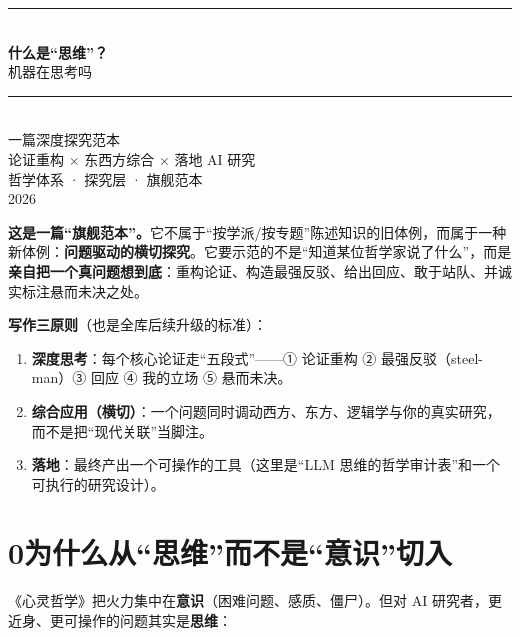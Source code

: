 \documentclass[12pt,a4paper,fontset=none]{ctexart}
\begin{document}
\thispagestyle{empty}
\begin{center}
\vspace*{3.2cm}
{\color{rule}\rule{0.5\textwidth}{0.8pt}}\\[1.1cm]
{\Huge\hei\bfseries\color{ink} 什么是“思维”？}\\[0.6cm]
{\LARGE\notolight\color{accent} 机器在思考吗}\\[1.1cm]
{\color{rule}\rule{0.5\textwidth}{0.8pt}}\\[2.2cm]
{\large\notolight\color{ink!80} 一篇深度探究范本\\[0.4em]
论证重构 × 东西方综合 × 落地 AI 研究}\\[3.2cm]
{\normalsize\sffamily\color{notebar} 哲学体系 · 探究层 · 旗舰范本}\\[0.3em]
{\small\sffamily\color{notebar} 2026}
\end{center}
\clearpage

\thispagestyle{fancy}
\begin{note}
\textbf{这是一篇“旗舰范本”。}它不属于“按学派/按专题”陈述知识的旧体例，而属于一种新体例：\textbf{问题驱动的横切探究}。它要示范的不是“知道某位哲学家说了什么”，而是\textbf{亲自把一个真问题想到底}：重构论证、构造最强反驳、给出回应、敢于站队、并诚实标注悬而未决之处。
\end{note}

\noindent\textbf{写作三原则}（也是全库后续升级的标准）：
\begin{enumerate}[leftmargin=2.2em,itemsep=0.25em]
\item \textbf{深度思考}：每个核心论证走“五段式”——① 论证重构 ② 最强反驳（steel-man）③ 回应 ④ 我的立场 ⑤ 悬而未决。
\item \textbf{综合应用（横切）}：一个问题同时调动西方、东方、逻辑学与你的真实研究，而不是把“现代关联”当脚注。
\item \textbf{落地}：最终产出一个可操作的工具（这里是“LLM 思维的哲学审计表”和一个可执行的研究设计）。
\end{enumerate}

\section*{0\quad 为什么从“思维”而不是“意识”切入}

《心灵哲学》把火力集中在\textbf{意识}（困难问题、感质、僵尸）。但对 AI 研究者，更近身、更可操作的问题其实是\textbf{思维}：
\end{document}
